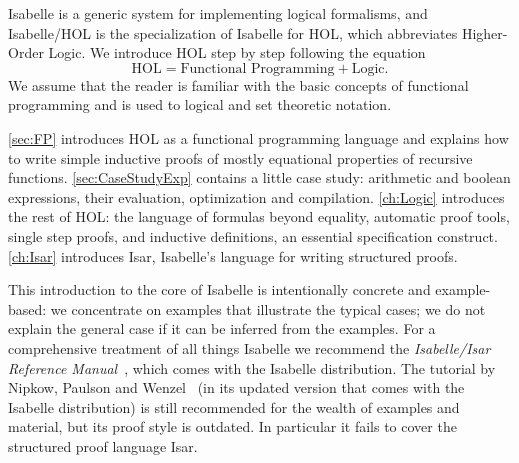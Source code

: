 Isabelle is a generic system for
implementing logical formalisms, and Isabelle/HOL is the specialization
of Isabelle for HOL, which abbreviates Higher-Order Logic. We introduce
HOL step by step following the equation
\[ \mbox{HOL} = \mbox{Functional Programming} + \mbox{Logic}. \]
We assume that the reader is familiar with the basic concepts of functional
programming and is used to logical and set theoretic notation.

\autoref{sec:FP} introduces HOL as a functional programming language and
explains how to write simple inductive proofs of mostly equational properties
of recursive functions.
\sem
\autoref{sec:CaseStudyExp} contains a
little case study: arithmetic and boolean expressions, their evaluation,
optimization and compilation.
\endsem
\autoref{ch:Logic} introduces the rest of HOL: the
language of formulas beyond equality, automatic proof tools, single
step proofs, and inductive definitions, an essential specification construct.
\autoref{ch:Isar} introduces Isar, Isabelle's language for writing structured
proofs.



This introduction to the core of Isabelle is intentionally concrete and
example-based: we concentrate on examples that illustrate the typical cases;
we do not explain the general case if it can be inferred from the examples.
For a comprehensive treatment of all things Isabelle we recommend the
\emph{Isabelle/Isar Reference Manual}~\cite{IsarRef}, which comes with the
Isabelle distribution.
The tutorial by Nipkow, Paulson and Wenzel~\cite{LNCS2283} (in its updated version that comes with the Isabelle distribution) is still recommended for the wealth of examples and material, but its proof style is outdated. In particular it fails to cover the structured proof language Isar.